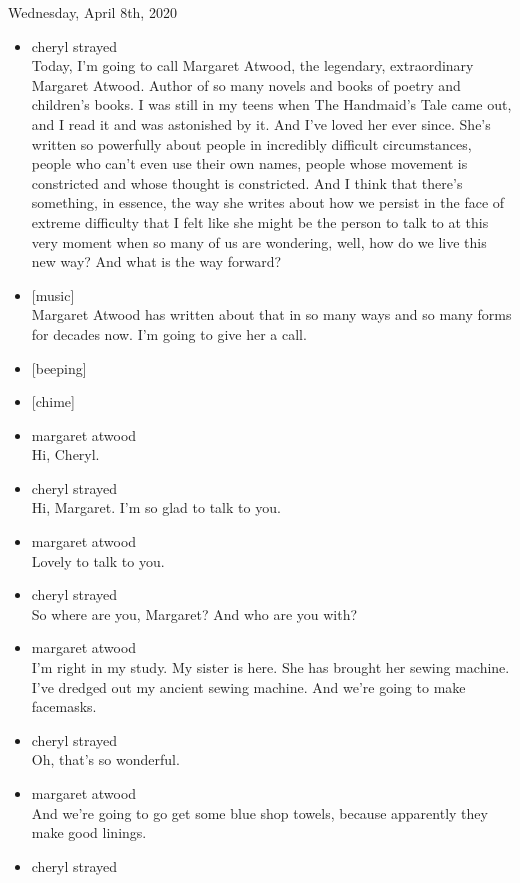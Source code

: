Wednesday, April 8th, 2020

\begin{itemize}
\item
  cheryl strayed\\
  Today, I'm going to call Margaret Atwood, the legendary, extraordinary
  Margaret Atwood. Author of so many novels and books of poetry and
  children's books. I was still in my teens when The Handmaid's Tale
  came out, and I read it and was astonished by it. And I've loved her
  ever since. She's written so powerfully about people in incredibly
  difficult circumstances, people who can't even use their own names,
  people whose movement is constricted and whose thought is constricted.
  And I think that there's something, in essence, the way she writes
  about how we persist in the face of extreme difficulty that I felt
  like she might be the person to talk to at this very moment when so
  many of us are wondering, well, how do we live this new way? And what
  is the way forward?
\item
  {[}music{]}\\
  Margaret Atwood has written about that in so many ways and so many
  forms for decades now. I'm going to give her a call.
\item
  {[}beeping{]}
\item
  {[}chime{]}
\item
  margaret atwood\\
  Hi, Cheryl.
\item
  cheryl strayed\\
  Hi, Margaret. I'm so glad to talk to you.
\item
  margaret atwood\\
  Lovely to talk to you.
\item
  cheryl strayed\\
  So where are you, Margaret? And who are you with?
\item
  margaret atwood\\
  I'm right in my study. My sister is here. She has brought her sewing
  machine. I've dredged out my ancient sewing machine. And we're going
  to make facemasks.
\item
  cheryl strayed\\
  Oh, that's so wonderful.
\item
  margaret atwood\\
  And we're going to go get some blue shop towels, because apparently
  they make good linings.
\item
  cheryl strayed\\

\end{itemize}
